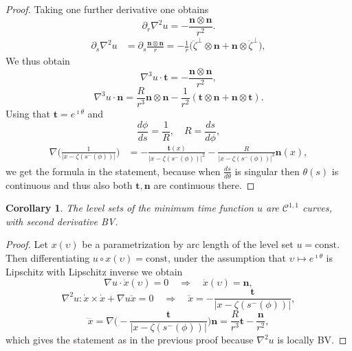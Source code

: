 \documentclass[reqno]{amsart}
\newcounter{assu}
\theoremstyle{definition} \newtheorem{definition}{Definition}[section]
\theoremstyle{definition} \newtheorem{remark}[definition]{Remark}
\theoremstyle{plain} \newtheorem{lemma}[definition]{Lemma}
\theoremstyle{plain} \newtheorem{proposition}[definition]{Proposition}
\theoremstyle{plain} \newtheorem{theorem}[definition]{Theorem}
\theoremstyle{plain} \newtheorem{corollary}[definition]{Corollary}
\theoremstyle{definition} \newtheorem{example}[definition]{Example}
\theoremstyle{plain} \newtheorem{claim}[clai]{Claim}
\theoremstyle{definition} \newtheorem{assumption}[definition]{Assumption}
\theoremstyle{definition} \newtheorem{observation}[definition]{Observation}
\newcommand{\n}{\mathbf n}
\newcommand{\1}{\mathbbm 1}
\renewcommand{\i}{\imath}
\numberwithin{equation}{section} %
\theoremstyle{plain} \newtheorem*{theorem*}{Theorem}
\theoremstyle{plain} \newtheorem{mthm}[maintheorem]{Main Theorem}
\theoremstyle{plain} \newtheorem*{mthm*}{Main Theorem}
\theoremstyle{plain} \newtheorem*{conjecture*}{Conjecture}
\theoremstyle{plain} \newtheorem{conjecture}[definition]{Conjecture}
\theoremstyle{plain} \newtheorem*{problem*}{Problem}
\begin{document}
\begin{proof}
Taking one further derivative one obtains
\begin{equation*}
\partial_r \nabla^2 u = - \frac{\n \otimes \n}{r^2}.
\end{equation*}
\begin{equation*}
\begin{split}
\partial_s \nabla^2 u &= \partial_s \frac{\n \otimes \n}{r} = - \frac{1}{r} \big( \ddot \zeta^\perp \otimes \mathbf n + \mathbf n \otimes \ddot \zeta^\perp \big),
\end{split}
\end{equation*}
We thus obtain
\begin{equation*}
\nabla^3 u \cdot \mathbf t = - \frac{\n \otimes \n}{r^2},
\end{equation*}
\begin{equation*}
\nabla^3 u \cdot \mathbf n = \frac{R}{r^3} \n \otimes \n - \frac{1}{r^2} (\mathbf t \otimes \n + \n \otimes \mathbf t).
\end{equation*}
Using that $\mathbf t = e^{\i \theta}$ and
\begin{equation*}
\frac{d\phi}{ds} = \frac{1}{R}, \quad R = \frac{ds}{d\phi},
\end{equation*}
\begin{equation*}
\begin{split}
\nabla \bigg( \frac{1}{|x - \zeta(s^-(\phi))|} \bigg) &= - \frac{\mathbf t(x)}{|x - \zeta(s^-(\phi))|^2} - \frac{R}{|x - \zeta(s^-(\phi))|^3} \mathbf n(x),
\end{split}
\end{equation*}
we get the formula in the statement, because when $\frac{ds}{d\theta}$ is singular then $\theta(s)$ is continuous and thus also both $\mathbf t,\n$ are continuous there.
\end{proof}

\begin{corollary}
\label{lem:C:1:1}
The level sets of the minimum time function $u$ are $\mathcal{C}^{1,1}$ curves, with second derivative BV.
\end{corollary}

\begin{proof}Let $x(\upsilon)$ be a parametrization by arc length of the level set $u = \text{const}$. Then differentiating $u \circ x(\upsilon) = \text{const}$, under the assumption that $\upsilon \mapsto e^{\i \theta}$ is Lipschitz with Lipschitz inverse we obtain
\begin{equation*}
\nabla u \cdot \dot {x}(\upsilon) = 0 \quad \Longrightarrow \quad \dot{x}(\upsilon) = \mathbf n,
\end{equation*}
\begin{equation*}
\nabla^2 u : \dot{x} \times \dot{x} + \nabla u \ddot{x} = 0 \quad \Longrightarrow \quad \ddot{x} = - \frac{\mathbf t}{|x - \zeta(s^-(\phi))|},
\end{equation*}
\begin{equation*}
\dddot{x} = \nabla \bigg( - \frac{\mathbf t}{|x - \zeta(s^-(\phi))|} \bigg) \mathbf n = \frac{R}{r^3} \mathbf t - \frac{\n}{r^2}, 
\end{equation*}
which gives the statement as in the previous proof because $\nabla^2 u$ is locally BV.
\end{proof}
\end{document}
